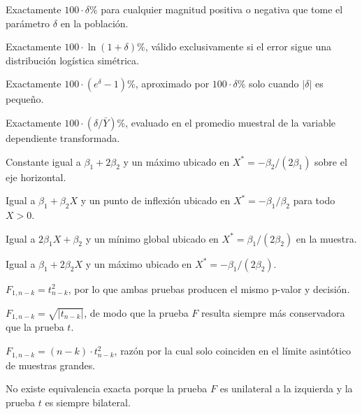 \begin{opts}
    \item Exactamente $100 \cdot \delta\%$ para cualquier magnitud positiva o negativa que tome el parámetro $\delta$ en la población.
    \item Exactamente $100 \cdot \ln(1 + \delta)\%$, válido exclusivamente si el error sigue una distribución logística simétrica.
    \item Exactamente $100 \cdot (e^{\delta} - 1)\%$, aproximado por $100 \cdot \delta\%$ solo cuando $|\delta|$ es pequeño.
    \item Exactamente $100 \cdot (\delta / \bar{Y})\%$, evaluado en el promedio muestral de la variable dependiente transformada.
\end{opts}

\begin{opts}
    \item Constante igual a $\beta_1 + 2\beta_2$ y un máximo ubicado en $X^* = -\beta_2 / (2\beta_1)$ sobre el eje horizontal.
    \item Igual a $\beta_1 + \beta_2 X$ y un punto de inflexión ubicado en $X^* = -\beta_1 / \beta_2$ para todo $X > 0$.
    \item Igual a $2\beta_1 X + \beta_2$ y un mínimo global ubicado en $X^* = \beta_1 / (2\beta_2)$ en la muestra.
    \item Igual a $\beta_1 + 2\beta_2 X$ y un máximo ubicado en $X^* = -\beta_1 / (2\beta_2)$.
\end{opts}

\begin{opts}
    \item $F_{1, n-k} = t_{n-k}^2$, por lo que ambas pruebas producen el mismo p-valor y decisión.
    \item $F_{1, n-k} = \sqrt{|t_{n-k}|}$, de modo que la prueba $F$ resulta siempre más conservadora que la prueba $t$.
    \item $F_{1, n-k} = (n - k) \cdot t_{n-k}^2$, razón por la cual solo coinciden en el límite asintótico de muestras grandes.
    \item No existe equivalencia exacta porque la prueba $F$ es unilateral a la izquierda y la prueba $t$ es siempre bilateral.
\end{opts}

